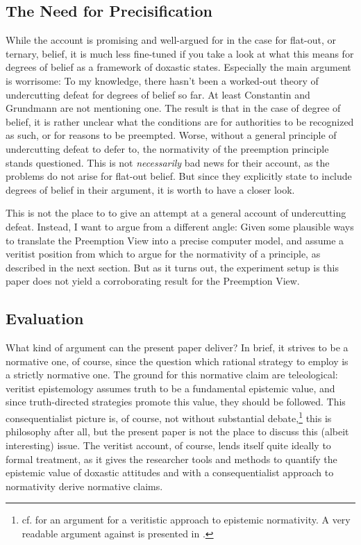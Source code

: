 \documentclass[11pt, a4paper]{scrartcl}
\renewcommand{\i}[1]{\emph{#1}}
\begin{document}
\subsection{The Need for Precisification}

While the account is promising and well-argued for in the case for flat-out, or ternary, belief, it is much less fine-tuned if you take a look at what this means for degrees of belief as a framework of doxastic states. Especially the main argument is worrisome: To my knowledge, there hasn't been a worked-out theory of undercutting defeat for degrees of belief so far. At least Constantin and Grundmann are not mentioning one. The result is that in the case of degree of belief, it is rather unclear what the conditions are for authorities to be recognized as such, or for reasons to be preempted. Worse, without a general principle of undercutting defeat to defer to, the normativity of the preemption principle stands questioned. This is not \i{necessarily} bad news for their account, as the problems do not arise for flat-out belief. But since they explicitly state to include degrees of belief in their argument, it is worth to have a closer look. 

This is not the place to to give an attempt at a general account of undercutting defeat. Instead, I want to argue from a different angle: Given some plausible ways to translate the Preemption View into a precise computer model, and assume a veritist position from which to argue for the normativity of a principle, as described in the next section. But as it turns out, the experiment setup is this paper does not yield a corroborating result for the Preemption View. 

\subsection{Evaluation}

What kind of argument can the present paper deliver? In brief, it strives to be a normative one, of course, since the question which rational strategy to employ is a strictly normative one. The ground for this normative claim are teleological: veritist epistemology assumes truth to be a fundamental epistemic value, and since truth-directed strategies promote this value, they should be followed. This consequentialist picture is, of course, not without substantial debate,\footnote{cf. \textcite{Goldman2001} for an argument for a veritistic approach to epistemic normativity. A very readable argument against is presented in \textcite{Berker2013}.} this is philosophy after all, but the present paper is not the place to discuss this (albeit interesting) issue. The veritist account, of course, lends itself quite ideally to formal treatment, as it gives the researcher tools and methods to quantify the epistemic value of doxastic attitudes and with a consequentialist approach to normativity derive normative claims.
\end{document}
